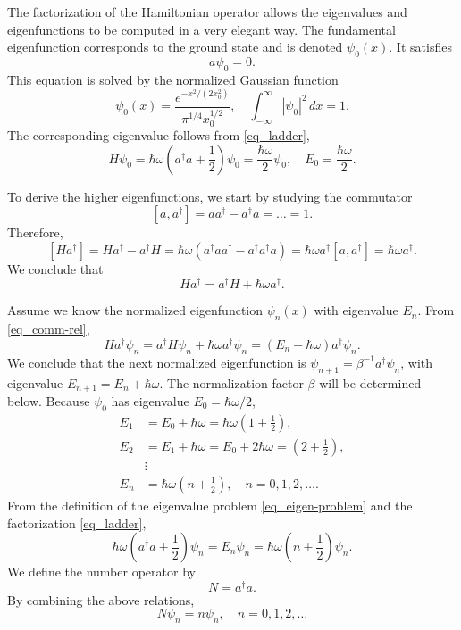 \documentclass[11pt]{article}
\begin{document}
The factorization of the Hamiltonian operator allows the eigenvalues and eigenfunctions to be
computed in a very elegant way. The fundamental eigenfunction corresponds to the ground state and is
denoted $\psi_0(x)$. It satisfies
\[
a \psi_0 = 0.
\]
This equation is solved by the normalized Gaussian function
\[
\psi_0(x) = \frac{e^{-x^2/(2 x_0^2)}}{\pi^{1/4} x_0^{1/2}},\quad \int_{-\infty}^\infty |\psi_0|^2 \,
dx = 1.
\]
The corresponding eigenvalue follows from \eqref{eq_ladder},
\[
H\psi_0 = \hbar\omega\left( a^\dag a + \frac{1}{2} \right)\psi_0 = \frac{\hbar\omega}{2}
\psi_0,\quad E_0 = \frac{\hbar\omega}{2}.
\]

To derive the higher eigenfunctions, we start by studying the commutator
\begin{equation}\label{eq_a-commut}
[a,a^\dag] = a a^\dag - a^\dag a = \ldots = 1.
\end{equation}
Therefore,
\[
  [Ha^\dag] = Ha^\dag - a^\dag H = \hbar\omega(a^\dag a a^\dag - a^\dag a^\dag a) =
%
  \hbar\omega a^\dag[a,a^\dag] =   \hbar\omega a^\dag.
\]
We conclude that
\begin{equation}\label{eq_comm-rel}
H a^\dag = a^\dag H +  \hbar\omega a^\dag.
\end{equation}

Assume we know the normalized eigenfunction $\psi_n(x)$ with eigenvalue $E_n$. From
\eqref{eq_comm-rel},
\[
H a^\dag\psi_n = a^\dag H \psi_n +  \hbar\omega a^\dag \psi_n = (E_n + \hbar\omega) a^\dag \psi_n.
\]
We conclude that the next normalized eigenfunction is $\psi_{n+1} = \beta^{-1} a^\dag \psi_n$, with
eigenvalue $E_{n+1} = E_n + \hbar\omega$. The normalization factor $\beta$ will be determined below.
Because $\psi_0$ has eigenvalue $E_0 = \hbar\omega/2$,
\begin{align*}
  E_1 &= E_0 + \hbar\omega = \hbar\omega\left( 1+\frac{1}{2} \right),\\
  E_2 &= E_1 + \hbar\omega = E_0 + 2\hbar\omega = \left( 2 + \frac{1}{2} \right),\\
  &\vdots\\
  E_n &= \hbar\omega\left( n + \frac{1}{2} \right),\quad n=0,1,2,\ldots.
\end{align*}
From the definition of the eigenvalue problem \eqref{eq_eigen-problem} and the factorization
\eqref{eq_ladder},
\[
\hbar\omega\left( a^\dag a + \frac{1}{2} \right)\psi_n = E_n \psi_n = \hbar\omega\left( n +
\frac{1}{2} \right)\psi_n. 
\]
We define the number operator by
\begin{equation}\label{eq_numer-op}
N = a^\dag a.
\end{equation}
By combining the above relations,
\[
N\psi_n = n \psi_n,\quad n=0,1,2,\ldots
\]
\end{document}
